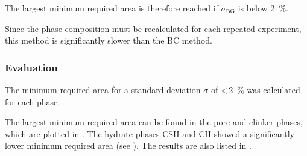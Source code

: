 The largest minimum required area is therefore reached if $\sigma_{\text{BG}}$ is below \qty{2}{\percent}.

Since the phase composition must be recalculated for each repeated experiment, this method is significantly slower than the \ac{BC} method.


\subsubsection{Evaluation}

The minimum required area for a standard deviation $\sigma$ of <\,\qty{2}{\percent} was calculated for each phase.

The largest minimum required area can be found in the pore and clinker phases, which are plotted in .
The hydrate phases \ac{CSH} and \ac{CH} showed a significantly lower minimum required area (see ).
The results are also listed in .


